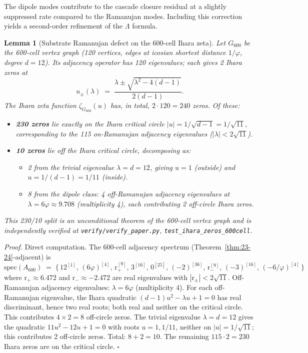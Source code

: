 \documentclass[11pt]{article}
\theoremstyle{plain}
\newtheorem{lemma}[theorem]{Lemma}
\theoremstyle{definition}
\theoremstyle{remark}
\begin{document}
The dipole modes contribute to the cascade closure residual at a slightly suppressed rate compared to the Ramanujan modes. Including this correction yields a second-order refinement of the $\Lambda$ formula.

\begin{lemma}[Substrate Ramanujan defect on the 600-cell Ihara zeta]\label{lem:230-10}
Let $G_{600}$ be the 600-cell vertex graph (120 vertices, edges at icosian shortest distance $1/\varphi$, degree $d = 12$). Its adjacency operator has 120 eigenvalues; each gives 2 Ihara zeros at
\[
  u_{\pm}(\lambda) \;=\; \frac{\lambda \pm \sqrt{\lambda^2 - 4(d-1)}}{2(d-1)}.
\]
The Ihara zeta function $\zeta_{G_{600}}(u)$ has, in total, $2 \cdot 120 = 240$ zeros. Of these:
\begin{itemize}[leftmargin=2em]
\item \textbf{230 zeros} lie exactly on the Ihara critical circle $|u| = 1/\sqrt{d-1} = 1/\sqrt{11}$, corresponding to the 115 on-Ramanujan adjacency eigenvalues ($|\lambda| < 2\sqrt{11}$).
\item \textbf{10 zeros} lie off the Ihara critical circle, decomposing as:
\begin{itemize}
\item 2 from the trivial eigenvalue $\lambda = d = 12$, giving $u = 1$ (outside) and $u = 1/(d-1) = 1/11$ (inside).
\item 8 from the dipole class: 4 off-Ramanujan adjacency eigenvalues at $\lambda = 6\varphi \approx 9.708$ (multiplicity 4), each contributing 2 off-circle Ihara zeros.
\end{itemize}
\end{itemize}
This 230/10 split is an unconditional theorem of the 600-cell vertex graph and is independently verified at \texttt{verify/verify\_paper.py}, \texttt{test\_ihara\_zeros\_600cell}.
\end{lemma}

\noindent\emph{Proof.} Direct computation. The 600-cell adjacency spectrum (Theorem~\ref{thm:23-24}-adjacent) is
\[
  \mathrm{spec}(A_{600}) \;=\; \{\,12^{[1]}, \, (6\varphi)^{[4]}, \, \mathrm{r}_+^{[9]}, \, 3^{[16]}, \, 0^{[25]}, \, (-2)^{[36]}, \, \mathrm{r}_-^{[9]}, \, (-3)^{[16]}, \, (-6/\varphi)^{[4]}\,\}
\]
where $\mathrm{r}_+ \approx 6.472$ and $\mathrm{r}_- \approx -2.472$ are real eigenvalues with $|\mathrm{r}_\pm| < 2\sqrt{11}$. Off-Ramanujan adjacency eigenvalues: $\lambda = 6\varphi$ (multiplicity 4). For each off-Ramanujan eigenvalue, the Ihara quadratic $(d-1)u^2 - \lambda u + 1 = 0$ has real discriminant, hence two real roots; both real and neither on the critical circle. This contributes $4 \times 2 = 8$ off-circle zeros. The trivial eigenvalue $\lambda = d = 12$ gives the quadratic $11 u^2 - 12 u + 1 = 0$ with roots $u = 1, 1/11$, neither on $|u| = 1/\sqrt{11}$; this contributes 2 off-circle zeros. Total: $8 + 2 = 10$. The remaining $115 \cdot 2 = 230$ Ihara zeros are on the critical circle. \hfill$\square$
\end{document}
